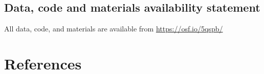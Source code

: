 \documentclass[
  american,
  ,man,floatsintext]{apa6}
\begin{document}
\hypertarget{data-code-and-materials-availability-statement}{%
\subsection{Data, code and materials availability statement}\label{data-code-and-materials-availability-statement}}

All data, code, and materials are available from \url{https://osf.io/5qspb/}

\hypertarget{references}{%
\section{References}\label{references}}

\setlength{\parindent}{-0.5in}
\setlength{\leftskip}{0.5in}
\end{document}
